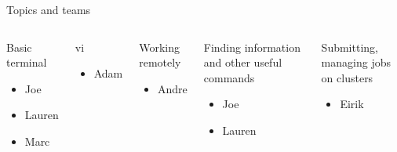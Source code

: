 \begin{frame}{Topics and teams}
\footnotesize

\begin{columns}
   \begin{block}{Basic terminal}
    \begin{itemize}
      \item Joe
      \item Lauren
      \item Marc
    \end{itemize}
   \end{block}

   \begin{block}{vi}
    \begin{itemize}
      \item Adam
    \end{itemize}
   \end{block}

   \begin{block}{Working remotely}
    \begin{itemize}
      \item Andre
    \end{itemize}
   \end{block}

   \begin{block}{Finding information and other useful commands}
    \begin{itemize}
      \item Joe
      \item Lauren
    \end{itemize}
   \end{block}

   \begin{block}{Submitting, managing jobs on clusters}
    \begin{itemize}
      \item Eirik
    \end{itemize}
   \end{block}
\end{columns}

%
%
%
%
%
%
%
%
%
%
%
%
%

\end{frame}
